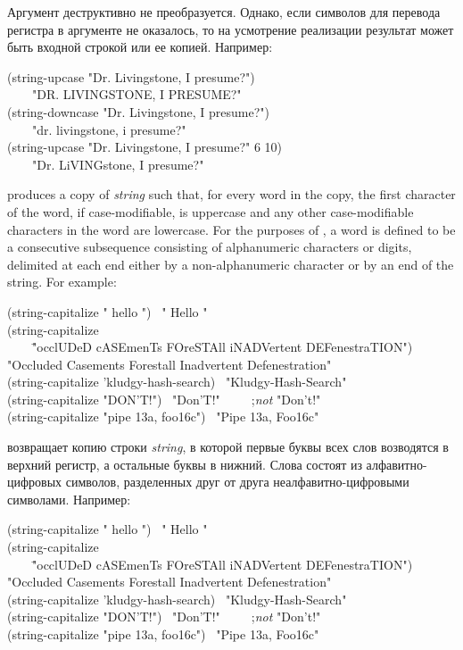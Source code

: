 \begin{defun}[Function]
Аргумент деструктивно не преобразуется. Однако, если символов для перевода
регистра в аргументе не оказалось, то на усмотрение реализации результат может
быть входной строкой или ее копией.
Например:
\begin{lisp}
(string-upcase "Dr. Livingstone, I presume?") \\
~~~\EV\ "DR. LIVINGSTONE, I PRESUME?" \\
(string-downcase "Dr. Livingstone, I presume?") \\
~~~\EV\ "dr. livingstone, i presume?" \\
(string-upcase "Dr. Livingstone, I presume?"  6  10) \\
~~~\EV\ "Dr. LiVINGstone, I presume?"
\end{lisp}

 produces a copy of \emph{string} such that,
for every word in the copy, the first character of the word,
if case-modifiable, is uppercase and
any other case-modifiable characters in the word are lowercase.
For the purposes of ,
a word is defined to be a
consecutive subsequence consisting of alphanumeric characters or digits,
delimited at each end either by a non-alphanumeric character
or by an end of the string.
For example:
\begin{lisp}
(string-capitalize " hello ") \EV\ " Hello " \\
(string-capitalize \\
~~~~\="occlUDeD cASEmenTs FOreSTAll iNADVertent DEFenestraTION") \\
\EV\>"Occluded Casements Forestall Inadvertent Defenestration" \\
(string-capitalize 'kludgy-hash-search) \EV\ "Kludgy-Hash-Search" \\
(string-capitalize "DON'T!") \EV\ "Don'T!"~~~~~;\emph{not} "Don't!" \\
(string-capitalize "pipe 13a, foo16c") \EV\ "Pipe 13a, Foo16c"
\end{lisp}

 возвращает копию строки \emph{string}, в которой первые
буквы всех слов возводятся в верхний регистр, а остальные буквы в нижний.
Слова состоят из алфавитно-цифровых символов, разделенных друг от друга
неалфавитно-цифровыми символами.
Например:
\begin{lisp}
(string-capitalize " hello ") \EV\ " Hello " \\
(string-capitalize \\
~~~~\="occlUDeD cASEmenTs FOreSTAll iNADVertent DEFenestraTION") \\
\EV\>"Occluded Casements Forestall Inadvertent Defenestration" \\
(string-capitalize 'kludgy-hash-search) \EV\ "Kludgy-Hash-Search" \\
(string-capitalize "DON'T!") \EV\ "Don'T!"~~~~~;\emph{not} "Don't!" \\
(string-capitalize "pipe 13a, foo16c") \EV\ "Pipe 13a, Foo16c"
\end{lisp}



\end{defun}
